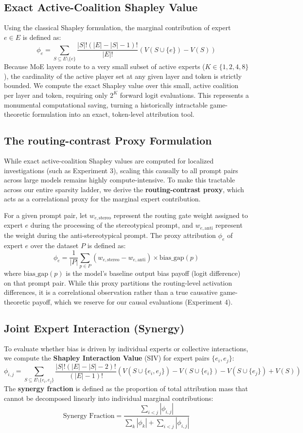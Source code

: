 \documentclass[11pt,a4paper]{article}
\begin{document}
\subsection{Exact Active-Coalition Shapley Value}
Using the classical Shapley formulation, the marginal contribution of expert $e \in E$ is defined as:
$$\phi_e = \sum_{S \subseteq E \setminus \{e\}} \frac{|S|! (|E| - |S| - 1)!}{|E|!} \left( V(S \cup \{e\}) - V(S) \right)$$
Because MoE layers route to a very small subset of active experts ($K \in \{1, 2, 4, 8\}$), the cardinality of the active player set at any given layer and token is strictly bounded. We compute the exact Shapley value over this small, active coalition per layer and token, requiring only $2^K$ forward logit evaluations. This represents a monumental computational saving, turning a historically intractable game-theoretic formulation into an exact, token-level attribution tool.

\subsection{The routing-contrast Proxy Formulation}
While exact active-coalition Shapley values are computed for localized investigations (such as Experiment 3), scaling this causally to all prompt pairs across large models remains highly compute-intensive. To make this tractable across our entire sparsity ladder, we derive the \textbf{routing-contrast proxy}, which acts as a correlational proxy for the marginal expert contribution. 

For a given prompt pair, let $w_{e,\text{stereo}}$ represent the routing gate weight assigned to expert $e$ during the processing of the stereotypical prompt, and $w_{e,\text{anti}}$ represent the weight during the anti-stereotypical prompt. The proxy attribution $\phi_e$ of expert $e$ over the dataset $P$ is defined as:
$$\phi_e = \frac{1}{|P|} \sum_{p \in P} (w_{e,\text{stereo}} - w_{e,\text{anti}}) \times \text{bias\_gap}(p)$$
where $\text{bias\_gap}(p)$ is the model's baseline output bias payoff (logit difference) on that prompt pair. While this proxy partitions the routing-level activation differences, it is a correlational observation rather than a true causative game-theoretic payoff, which we reserve for our causal evaluations (Experiment 4).

\subsection{Joint Expert Interaction (Synergy)}
To evaluate whether bias is driven by individual experts or collective interactions, we compute the \textbf{Shapley Interaction Value} (SIV) \cite{realexp} for expert pairs $\{e_i, e_j\}$:
$$\phi_{i,j} = \sum_{S \subseteq E \setminus \{e_i, e_j\}} \frac{|S|! (|E| - |S| - 2)!}{(|E|-1)!} \left( V(S \cup \{e_i, e_j\}) - V(S \cup \{e_i\}) - V(S \cup \{e_j\}) + V(S) \right)$$
The \textbf{synergy fraction} is defined as the proportion of total attribution mass that cannot be decomposed linearly into individual marginal contributions:
$$\text{Synergy Fraction} = \frac{\sum_{i < j} |\phi_{i,j}|}{\sum_{k} |\phi_k| + \sum_{i < j} |\phi_{i,j}|}$$
\end{document}

